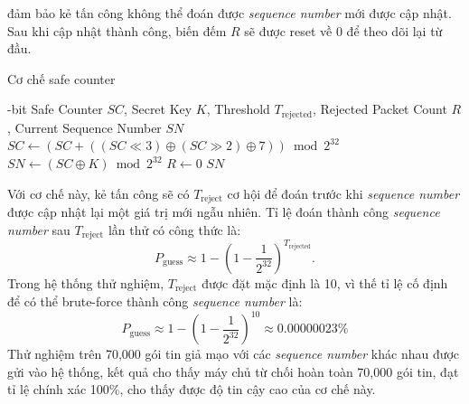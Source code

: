 đảm bảo kẻ tấn công không thể đoán được \textit{sequence number} mới được cập nhật. Sau khi cập nhật thành công, biến đếm $R$ sẽ được reset về 0 để theo dõi lại từ đầu.
\begin{algorithm}[ht]
\caption{Cơ chế safe counter}
\small
\label{alg:safe_counter}
\begin{algorithmic}[1]
-bit Safe Counter $SC$, Secret Key $K$, Threshold $T_{\text{rejected}}$, Rejected Packet Count $R$, Current Sequence Number $SN$
\State $SC \gets (SC + ((SC \ll 3) \oplus (SC \gg 2) \oplus 7)) \bmod 2^{32}$
    \State $SN \gets (SC \oplus K) \bmod 2^{32}$
    \State $R \gets 0$
\EndIf
\Return $SN$
\end{algorithmic}
\end{algorithm}

Với cơ chế này, kẻ tấn công sẽ có \(T_{\text{reject}} \) cơ hội để đoán trước khi \textit{sequence number} được cập nhật lại một giá trị mới ngẫu nhiên. Tỉ lệ đoán thành công \textit{sequence number} sau \(T_{\text{reject}} \) lần thử có công thức là:
\[
P_{\text{guess}} \approx 1 - \left(1 - \frac{1}{2^{32}}\right)^{T_{\text{rejected}}}.
\]
Trong hệ thống thử nghiệm, \(T_{\text{reject}} \) được đặt mặc định là 10, vì thế tỉ lệ cố định để có thể brute-force thành công \textit{sequence number} là:
\[
P_{\text{guess}} \approx 1 - \left(1 - \frac{1}{2^{32}}\right)^{10} \approx 0.00000023 \%
\]
Thử nghiệm trên 70,000 gói tin giả mạo với các \textit{sequence number} khác nhau được gửi vào hệ thống, kết quả cho thấy máy chủ từ chối hoàn toàn 70,000 gói tin, đạt tỉ lệ chính xác 100\%, cho thấy được độ tin cậy cao của cơ chế này. 




